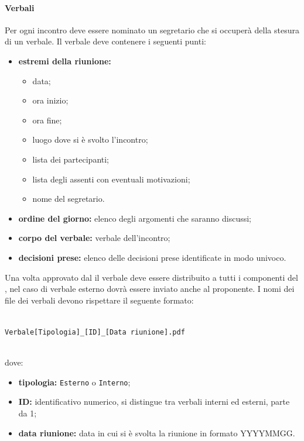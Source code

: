             \paragraph{Verbali}\label{sec:verbali}
            Per ogni incontro deve essere nominato un segretario che si occuperà della stesura di un verbale. Il verbale deve contenere i seguenti punti:
            \begin{itemize}
                \item \textbf{estremi della riunione:}
                    \begin{itemize}
                        \item data;
                        \item ora inizio;
                        \item ora fine;
                        \item luogo dove si è svolto l'incontro;
                        \item lista dei partecipanti;
                        \item lista degli assenti con eventuali motivazioni;
                        \item nome del segretario.
                    \end{itemize}
                \item \textbf{ordine del giorno:} elenco degli argomenti che saranno discussi;
                \item \textbf{corpo del verbale:} verbale dell'incontro;
                \item \textbf{decisioni prese:} elenco delle decisioni prese identificate in modo univoco.
            \end{itemize}
            Una volta approvato dal \responsabilediprogetto{} il verbale deve essere distribuito a tutti i componenti del , nel caso di verbale esterno dovrà essere inviato anche al proponente.
            I nomi dei file dei verbali devono rispettare il seguente formato:\\\\
            \centerline{\texttt{Verbale[Tipologia]\_[ID]\_[Data riunione].pdf}}\\
            dove:
            \begin{itemize}
                \item \textbf{tipologia:} \texttt{Esterno} o \texttt{Interno};
                \item \textbf{ID:} identificativo numerico, si distingue tra verbali interni ed esterni, parte da 1;
                \item \textbf{data riunione:} data in cui si è svolta la riunione in formato YYYYMMGG.
            \end{itemize}
